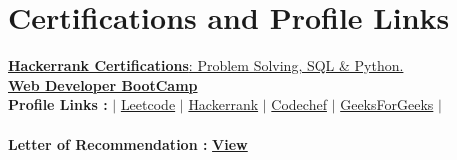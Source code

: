 \documentclass[letterpaper,11pt]{article}
\newcommand{\resumeSubHeadingListStart}{\begin{itemize}[leftmargin=*]}
\newcommand{\resumeSubHeadingListEnd}{\end{itemize}}
\begin{document}
\section{Certifications and Profile Links}
 \begin{itemize}[leftmargin=0.15in, label={}]
	\small{\item{
		\href{https://www.hackerrank.com/certificates/77eec5f8de43}{\textbf{Hackerrank Certifications}{: Problem Solving, SQL & Python.}} \\
 	    \href{https://www.udemy.com/certificate/UC-ca2017ef-dd44-4250-adc1-79f0ae8195fb/}{\textbf{Web Developer BootCamp}} \\
 	 
 	    \textbf{Profile Links :}{ $|$ \href{https://leetcode.com/yk1603/}{{Leetcode}} $|$ \href{https://www.hackerrank.com/h1906150}{{Hackerrank}} $|$ \href{https://www.codechef.com/users/yuthikakhedwal}{{Codechef}} $|$ \href{https://auth.geeksforgeeks.org/user/zypxfkw7bge7x11lgbmh4twoie0s8ous8gydedrv/profile}{{GeeksForGeeks}} $|$\\
 	    \ \
 	    \\{\textbf{Letter of Recommendation : }}\href{https://drive.google.com/file/d/1eIv--bWe10pMl44t-7muw9XLTtTg-3Sn/view?usp=sharing}{\bf View} }
	}}
 \end{itemize}
 \vspace{-16pt}


%


\end{document}
